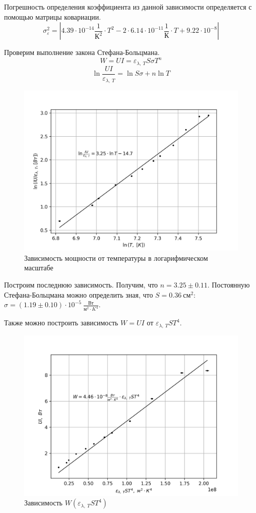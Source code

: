 \documentclass[14pt, a4paper]{report}
\begin{document}
\newpage

Погрешность определения коэффициента из данной зависимости определяется с помощью матрицы ковариации.
\[\sigma_\varepsilon^2=|4.39\cdot10^{-14}\frac{1}{К^2}\cdot T^2-2\cdot 6.14\cdot10^{-11}\frac{1}{К}\cdot T+9.22\cdot10^{-8}|\]

Проверим выполнение закона Стефана-Больцмана.
\[W=UI=\varepsilon_{\lambda,\ T}S\sigma T^n\]
\[\ln{\frac{UI}{\varepsilon_{\lambda,\ T}}}=\ln{S\sigma}+n\ln{T}\]

\begin{figure}[H]
\centering
\includegraphics[width=.8\linewidth]{../images/581-2}
\caption{Зависимость мощности от температуры в логарифмическом масштабе}
\end{figure}

Построим последнюю зависимость. Получим, что $n=3.25\pm0.11$. Постоянную Стефана-Больцмана можно определить зная, что $S=0.36\ см^2$: $\sigma=(1.19\pm0.10)\cdot10^{-5}\ \frac{Вт}{м^2\cdot K^4}$.

\newpage

Также можно построить зависимость $W=UI$ от $\varepsilon_{\lambda,\ T}ST^4$.

\begin{figure}[H]
\centering
\includegraphics[width=.8\linewidth]{../images/581-3}
\caption{Зависимость $W(\varepsilon_{\lambda,\ T}ST^4)$}
\end{figure}
\end{document}

